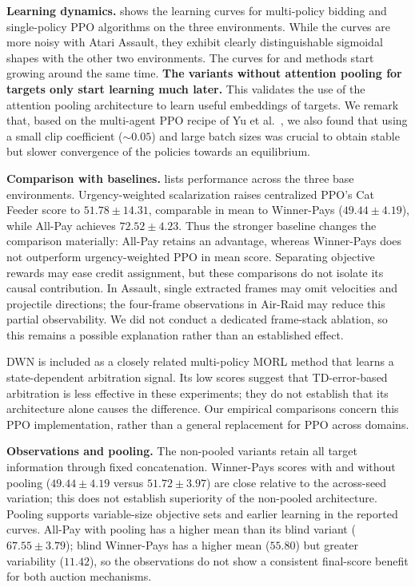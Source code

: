 % 
% 



\textbf{Learning dynamics.}\quad {} shows the learning curves for multi-policy bidding and single-policy PPO algorithms on the three environments.
While the curves are more noisy with Atari Assault, they exhibit clearly distinguishable sigmoidal shapes with the other two environments.
The curves for \allpay and \poorman methods start growing around the same time.
\textbf{The variants without attention pooling for targets only start learning much later.}
This validates the use of the attention pooling architecture to learn useful embeddings of targets.
We remark that, based on the multi-agent PPO recipe of Yu et al.~\citep{yu2022mappo}, we also found that using a small clip coefficient (\({\sim}0.05\)) and large batch sizes was crucial to obtain stable but slower convergence of the policies towards an equilibrium.

\textbf{Comparison with baselines.}\quad {} lists performance across the three base environments.
Urgency-weighted scalarization raises centralized PPO's Cat Feeder score to $51.78\pm14.31$, comparable in mean to Winner-Pays ($49.44\pm4.19$), while All-Pay achieves $72.52\pm4.23$.
Thus the stronger baseline changes the comparison materially: All-Pay retains an advantage, whereas Winner-Pays does not outperform urgency-weighted PPO in mean score.
Separating objective rewards may ease credit assignment, but these comparisons do not isolate its causal contribution.
In Assault, single extracted frames may omit velocities and projectile directions; the four-frame observations in Air-Raid may reduce this partial observability.
We did not conduct a dedicated frame-stack ablation, so this remains a possible explanation rather than an established effect.

DWN is included as a closely related multi-policy MORL method that learns a state-dependent arbitration signal.
Its low scores suggest that TD-error-based arbitration is less effective in these experiments; they do not establish that its architecture alone causes the difference.
Our empirical comparisons concern this PPO implementation, rather than a general replacement for PPO across domains.

\textbf{Observations and pooling.}\quad
The non-pooled variants retain all target information through fixed concatenation.
Winner-Pays scores with and without pooling ($49.44\pm4.19$ versus $51.72\pm3.97$) are close relative to the across-seed variation; this does not establish superiority of the non-pooled architecture.
Pooling supports variable-size objective sets and earlier learning in the reported curves.
All-Pay with pooling has a higher mean than its blind variant ($67.55\pm3.79$); blind Winner-Pays has a higher mean ($55.80$) but greater variability ($11.42$), so the observations do not show a consistent final-score benefit for both auction mechanisms.

